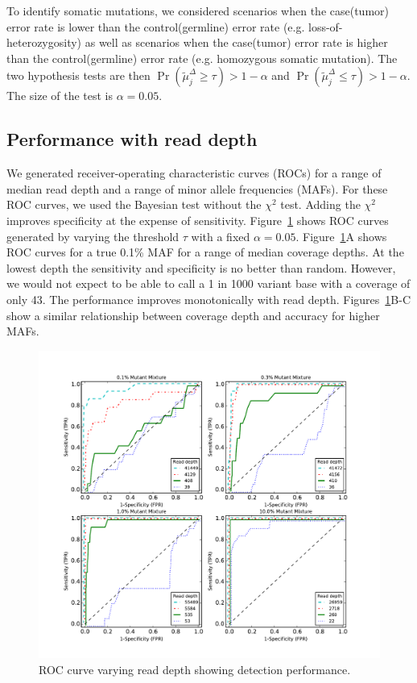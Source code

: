 \documentclass[11pt,reqno]{amsart}
\begin{document}
To identify somatic mutations, we considered scenarios when the case(tumor) error rate is lower than the control(germline) error rate (e.g. loss-of-heterozygosity) as well as scenarios when the case(tumor) error rate is higher than the control(germline) error rate (e.g. homozygous somatic mutation). The two hypothesis tests are then $\Pr( \tilde{\mu}_j^{\Delta} \geq \tau ) > 1-\alpha$ and $\Pr( \tilde{\mu}_j^{\Delta} \leq \tau ) > 1-\alpha$. The size of the test is $\alpha=0.05$.

\subsection{Performance with read depth}\label{sec:read_depth}

We generated receiver-operating characteristic curves (ROCs) for a range of median read depth and a range of minor allele frequencies (MAFs). For these ROC curves, we used the Bayesian test without the $\chi^2$ test. Adding the $\chi^2$ improves specificity at the expense of sensitivity. Figure~\ref{fig:ROC} shows ROC curves generated by varying the threshold $\tau$ with a fixed $\alpha=0.05$. Figure~\ref{fig:ROC}A shows ROC curves for a true 0.1\% MAF for a range of median coverage depths. At the lowest depth the sensitivity and specificity is no better than random. However, we would not expect to be able to call a 1 in 1000 variant base with a coverage of only 43. The performance improves monotonically with read depth. Figures~\ref{fig:ROC}B-C show a similar relationship between coverage depth and accuracy for higher MAFs.

\begin{figure}[htbp]
\begin{center}
\includegraphics[width=120mm]{pdf_figs/ROC_without_chi2.pdf}
\caption{ROC curve varying read depth showing detection performance.}
\label{fig:ROC}
\end{center}
\end{figure}
\end{document}
